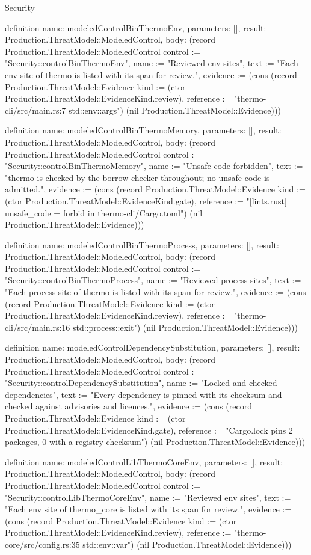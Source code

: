 \begin{lexlean}{Security}
\begin{semanticmodule}
definition{
  name: modeledControlBinThermoEnv,
  parameters: [],
  result: Production.ThreatModel::ModeledControl,
  body: (record Production.ThreatModel::ModeledControl {control := "Security::controlBinThermoEnv", name := "Reviewed env sites", text := "Each env site of thermo is listed with its span for review.", evidence := (cons (record Production.ThreatModel::Evidence {kind := (ctor Production.ThreatModel::EvidenceKind.review), reference := "thermo-cli/src/main.rs:7 std::env::args"}) (nil Production.ThreatModel::Evidence))})
}

definition{
  name: modeledControlBinThermoMemory,
  parameters: [],
  result: Production.ThreatModel::ModeledControl,
  body: (record Production.ThreatModel::ModeledControl {control := "Security::controlBinThermoMemory", name := "Unsafe code forbidden", text := "thermo is checked by the borrow checker throughout; no unsafe code is admitted.", evidence := (cons (record Production.ThreatModel::Evidence {kind := (ctor Production.ThreatModel::EvidenceKind.gate), reference := "[lints.rust] unsafe_code = forbid in thermo-cli/Cargo.toml"}) (nil Production.ThreatModel::Evidence))})
}

definition{
  name: modeledControlBinThermoProcess,
  parameters: [],
  result: Production.ThreatModel::ModeledControl,
  body: (record Production.ThreatModel::ModeledControl {control := "Security::controlBinThermoProcess", name := "Reviewed process sites", text := "Each process site of thermo is listed with its span for review.", evidence := (cons (record Production.ThreatModel::Evidence {kind := (ctor Production.ThreatModel::EvidenceKind.review), reference := "thermo-cli/src/main.rs:16 std::process::exit"}) (nil Production.ThreatModel::Evidence))})
}

definition{
  name: modeledControlDependencySubstitution,
  parameters: [],
  result: Production.ThreatModel::ModeledControl,
  body: (record Production.ThreatModel::ModeledControl {control := "Security::controlDependencySubstitution", name := "Locked and checked dependencies", text := "Every dependency is pinned with its checksum and checked against advisories and licences.", evidence := (cons (record Production.ThreatModel::Evidence {kind := (ctor Production.ThreatModel::EvidenceKind.gate), reference := "Cargo.lock pins 2 packages, 0 with a registry checksum"}) (nil Production.ThreatModel::Evidence))})
}

definition{
  name: modeledControlLibThermoCoreEnv,
  parameters: [],
  result: Production.ThreatModel::ModeledControl,
  body: (record Production.ThreatModel::ModeledControl {control := "Security::controlLibThermoCoreEnv", name := "Reviewed env sites", text := "Each env site of thermo_core is listed with its span for review.", evidence := (cons (record Production.ThreatModel::Evidence {kind := (ctor Production.ThreatModel::EvidenceKind.review), reference := "thermo-core/src/config.rs:35 std::env::var"}) (nil Production.ThreatModel::Evidence))})
}


\end{semanticmodule}
\end{lexlean}
